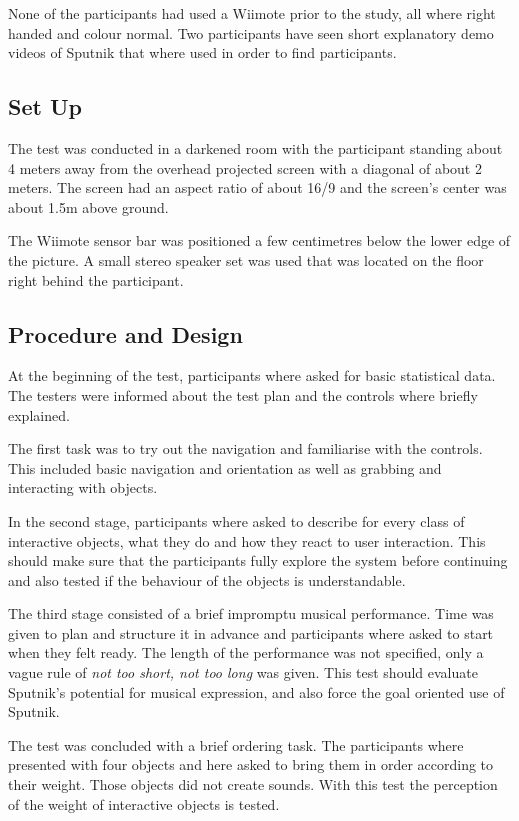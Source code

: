 \documentclass[10pt,a4paper]{scrartcl}
\begin{document}
None of the participants had used a Wiimote prior to the study, all where right handed and colour normal. Two participants have seen short explanatory demo videos of Sputnik that where used in order to find participants.

\subsection{Set Up}
The test was conducted in a darkened room with the participant standing about 4 meters away from the overhead projected screen with a diagonal of about 2 meters. The screen had an aspect ratio of about 16/9 and the screen's center was about 1.5m above ground.

The Wiimote sensor bar was positioned a few centimetres below the lower edge of the picture. A small stereo speaker set was used that was located on the floor right behind the participant.

\subsection{Procedure and Design}
At the beginning of the test, participants where asked for basic statistical data. The testers were informed about the test plan and the controls where briefly explained. 

The first task was to try out the navigation and familiarise with the controls. This included basic navigation and orientation as well as grabbing and interacting with objects.

In the second stage, participants where asked to describe for every class of interactive objects, what they do and how they react to user interaction. This should make sure that the participants fully explore the system before continuing and also tested if the behaviour of the objects is understandable.

The third stage consisted of a brief impromptu musical performance. Time was given to plan and structure it in advance and participants where asked to start when they felt ready. The length of the performance was not specified, only a vague rule of \emph{not too short, not too long} was given. This test should evaluate Sputnik's potential for musical expression, and also force the goal oriented use of Sputnik.

The test was concluded with a brief ordering task. The participants where presented with four objects and here asked to bring them in order according to their weight. Those objects did not create sounds. With this test the perception of the weight of interactive objects is tested.
\end{document}
